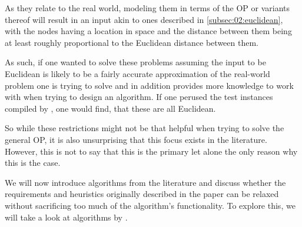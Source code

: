 As they relate to the real world, modeling them in terms of the OP or variants thereof 
will result in an input akin to ones described in \cref*{subsec:02:euclidean}, 
with the nodes having a location in space and the distance between them being at least roughly proportional to the Euclidean distance between them.

As such, if one wanted to solve these problems assuming the input to be Euclidean is likely to be a fairly accurate approximation of the real-world problem one is trying to solve and in addition provides more knowledge to work with when trying to design an algorithm.
If one perused the test instances compiled by \citeauthor{vansteenwegen_orienteering_2011} \cite{vansteenwegen_orienteering_2011}, 
one would find, that these are all Euclidean. 

So while these restrictions might not be that helpful when trying to solve the general OP, it is also unsurprising that this focus exists in the literature.
However, this is not to say that this is the primary let alone the only reason why this is the case.

We will now introduce algorithms from the literature and discuss 
whether the requirements and heuristics originally described in the paper can be relaxed without sacrificing too much of the algorithm's functionality.
To explore this, we will take a look at algorithms by \citeauthor{tsiligiridis_heuristic_1984}. \cite{tsiligiridis_heuristic_1984}

